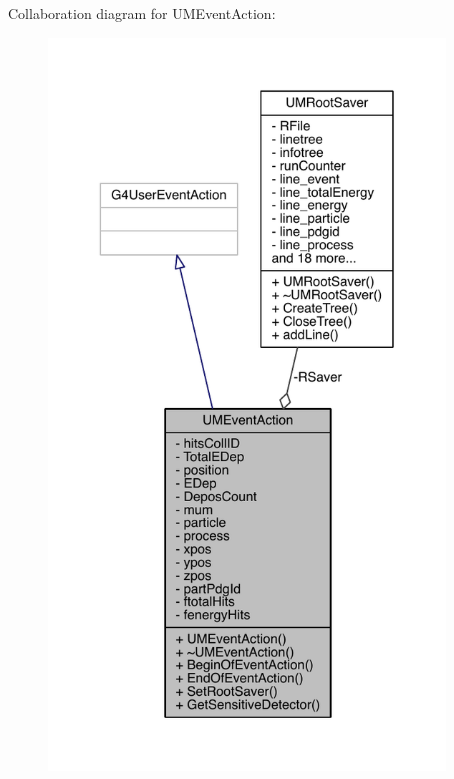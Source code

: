 Collaboration diagram for U\+M\+Event\+Action\+:
\nopagebreak
\begin{figure}[H]
\begin{center}
\leavevmode
\includegraphics[height=550pt]{classUMEventAction__coll__graph}
\end{center}
\end{figure}
